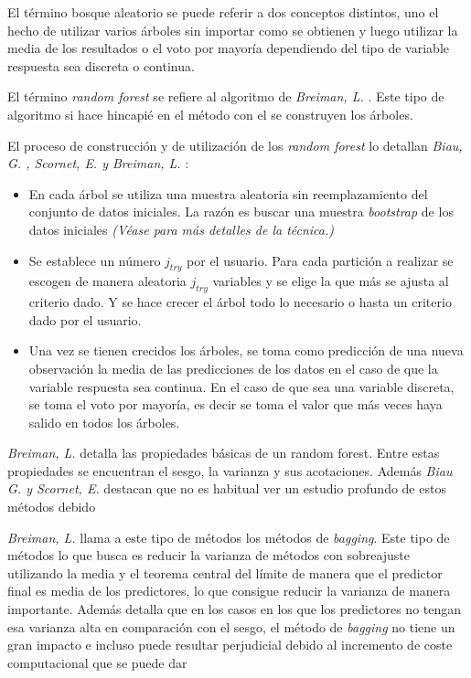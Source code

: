 \noindent El término bosque aleatorio se puede referir a dos conceptos distintos, uno el hecho de utilizar varios árboles sin importar como se obtienen y luego utilizar la media de los resultados o el voto por mayoría dependiendo del tipo de variable respuesta sea discreta o continua. 

\noindent El término \emph{random forest} se refiere al algoritmo de \emph{Breiman, L.} \cite{Breiman 2001}. Este tipo de algoritmo si hace hincapié en el  método con el se construyen los árboles. 

\noindent El proceso de construcción y de utilización de los \emph{random forest} lo detallan \emph{Biau, G. , Scornet, E. y Breiman, L.}\cite{Biau 2016,Breiman 2004} :
\begin{itemize}
\item En cada árbol se utiliza una muestra aleatoria sin reemplazamiento del conjunto de datos iniciales. La razón es buscar una muestra \emph{bootstrap} de los datos iniciales \emph{(Véase \cite{Hesterberg 2011} para más detalles de la técnica.)}
\item Se establece un número $j_{try}$ por el usuario. Para cada partición a realizar se escogen de manera aleatoria $j_{try}$ variables y se elige la que más se ajusta al criterio dado. Y se hace crecer el árbol todo lo necesario o hasta un criterio dado por el usuario. 
 
\item Una vez se tienen crecidos los árboles, se toma como predicción de una nueva observación la media de las predicciones de los datos en el caso de que la variable respuesta sea continua. En el caso de que sea una variable discreta, se toma el voto por mayoría, es decir se toma el valor que más veces haya salido en todos los árboles. 
\end{itemize}

\noindent \emph{Breiman, L.} \cite {Breiman 2004} detalla las propiedades básicas de un random forest. Entre estas propiedades se encuentran el sesgo, la varianza y sus acotaciones. Además \emph{Biau G. y Scornet, E. }\cite{Biau 2016} destacan que no es habitual ver un estudio profundo de estos métodos debido 

\noindent \emph{Breiman, L.} \cite{Breiman 1996} llama a este tipo de métodos los métodos de \emph{bagging}. Este tipo de métodos lo que busca es reducir la varianza de métodos con sobreajuste utilizando la media y el teorema central del límite de manera que el predictor final es media de los predictores, lo que consigue reducir la varianza de manera importante. Además detalla que en los casos en los que los predictores no tengan esa varianza alta en comparación con el sesgo, el método de \emph{bagging} no tiene un gran impacto e incluso puede resultar perjudicial debido al incremento de coste computacional que se puede dar
